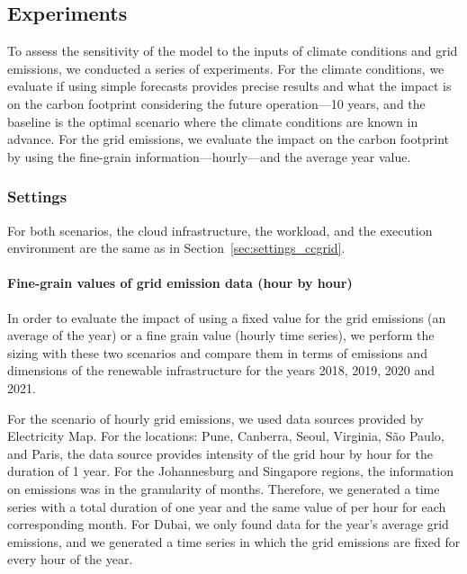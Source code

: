 \subsection{Experiments}

To assess the sensitivity of the model to the inputs of climate conditions and grid emissions, we conducted a series of experiments. For the climate conditions, we evaluate if using simple forecasts provides precise results and what the impact is on the carbon footprint considering the future operation---10 years, and the baseline is the optimal scenario where the climate conditions are known in advance. For the grid emissions, we evaluate the impact on the carbon footprint by using the fine-grain information---hourly---and the average year value.


\subsubsection{Settings}


For both scenarios, the cloud infrastructure, the workload, and the execution environment are the same as in Section~\ref{sec:settings_ccgrid}.


\paragraph{Fine-grain values of grid emission data (hour by hour)}

In order to evaluate the impact of using a fixed value for the grid emissions (an average of the year)  or a fine grain value (hourly time series), we perform the sizing with these two scenarios and compare them in terms of  emissions and dimensions of the renewable infrastructure for the years 2018, 2019, 2020 and 2021.

For the scenario of hourly grid emissions, we used data sources provided by Electricity Map. For the locations: Pune, Canberra, Seoul, Virginia, São Paulo, and Paris, the data source provides  intensity of the grid hour by hour for the duration of 1 year. For the Johannesburg and Singapore regions, the information on  emissions was in the granularity of months. Therefore, we generated a time series with a total duration of one year and the same value of  per hour for each corresponding month. For Dubai, we only found data for the year's average grid  emissions, and we generated a time series in which the grid emissions are fixed for every hour of the year.


